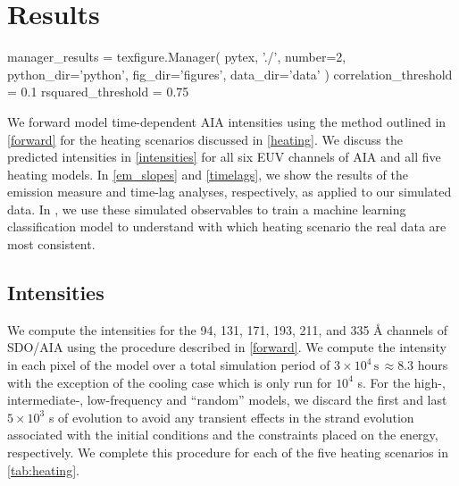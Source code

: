 \section{Results}\label{results}

\begin{pycode}
manager_results = texfigure.Manager(
    pytex,
    './',
    number=2,
    python_dir='python',
    fig_dir='figures',
    data_dir='data'
)
correlation_threshold = 0.1
rsquared_threshold = 0.75
\end{pycode}

We forward model time-dependent AIA intensities using the method outlined in \autoref{forward} for the heating scenarios discussed in \autoref{heating}. We discuss the predicted intensities in \autoref{intensities} for all six EUV channels of AIA and all five heating models. In \autoref{em_slopes} and \autoref{timelags}, we show the results of the emission measure and time-lag analyses, respectively, as applied to our simulated data. In , we use these simulated observables to train a machine learning classification model to understand with which heating scenario the real data are most consistent.

\subsection{Intensities}\label{intensities}

We compute the intensities for the 94, 131, 171, 193, 211, and 335 \AA{} channels of SDO/AIA using the procedure described in \autoref{forward}. We compute the intensity in each pixel of the model \AR{} over a total simulation period of $3\times10^4\,\mathrm{s}\,\approx8.3$ hours with the exception of the cooling case which is only run for $10^4$ s. For the high-, intermediate-, low-frequency and ``random'' models, we discard the first and last $5\times10^3$ s of evolution to avoid any transient effects in the strand evolution associated with the initial conditions and the constraints placed on the energy, respectively. We complete this procedure for each of the five heating scenarios in \autoref{tab:heating}.

